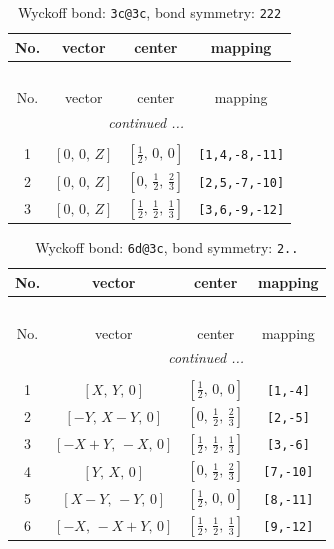 \documentclass[fleqn,8pt]{jsarticle}
\begin{document}
\renewcommand{\arraystretch}{1.2}
\begin{longtable}{cccc}
\caption{Wyckoff bond: {\tt 3c@3c}, bond symmetry: {\tt 222}}
 \\
 \hline \hline
No. & vector & center & mapping \\ \hline \endfirsthead

\multicolumn{3}{l}{\tablename\ \thetable{}} \\
 \hline \hline
No. & vector & center & mapping \\ \hline \endhead

 \hline \hline
\multicolumn{3}{r}{\footnotesize\it continued ...} \\ \endfoot

 \hline \hline
\multicolumn{3}{r}{} \\ \endlastfoot

1 & $\left[ 0,\, 0,\, Z \right]$ & $\left[ \frac{1}{2},\, 0,\, 0 \right]$ & {\tt [1,4,-8,-11]} \\ \hline
2 & $\left[ 0,\, 0,\, Z \right]$ & $\left[ 0,\, \frac{1}{2},\, \frac{2}{3} \right]$ & {\tt [2,5,-7,-10]} \\ \hline
3 & $\left[ 0,\, 0,\, Z \right]$ & $\left[ \frac{1}{2},\, \frac{1}{2},\, \frac{1}{3} \right]$ & {\tt [3,6,-9,-12]} \\
\end{longtable}
\renewcommand{\arraystretch}{1.2}
\begin{longtable}{cccc}
\caption{Wyckoff bond: {\tt 6d@3c}, bond symmetry: {\tt 2..}}
 \\
 \hline \hline
No. & vector & center & mapping \\ \hline \endfirsthead

\multicolumn{3}{l}{\tablename\ \thetable{}} \\
 \hline \hline
No. & vector & center & mapping \\ \hline \endhead

 \hline \hline
\multicolumn{3}{r}{\footnotesize\it continued ...} \\ \endfoot

 \hline \hline
\multicolumn{3}{r}{} \\ \endlastfoot

1 & $\left[ X,\, Y,\, 0 \right]$ & $\left[ \frac{1}{2},\, 0,\, 0 \right]$ & {\tt [1,-4]} \\ \hline
2 & $\left[ - Y,\, X - Y,\, 0 \right]$ & $\left[ 0,\, \frac{1}{2},\, \frac{2}{3} \right]$ & {\tt [2,-5]} \\ \hline
3 & $\left[ - X + Y,\, - X,\, 0 \right]$ & $\left[ \frac{1}{2},\, \frac{1}{2},\, \frac{1}{3} \right]$ & {\tt [3,-6]} \\ \hline
4 & $\left[ Y,\, X,\, 0 \right]$ & $\left[ 0,\, \frac{1}{2},\, \frac{2}{3} \right]$ & {\tt [7,-10]} \\ \hline
5 & $\left[ X - Y,\, - Y,\, 0 \right]$ & $\left[ \frac{1}{2},\, 0,\, 0 \right]$ & {\tt [8,-11]} \\ \hline
6 & $\left[ - X,\, - X + Y,\, 0 \right]$ & $\left[ \frac{1}{2},\, \frac{1}{2},\, \frac{1}{3} \right]$ & {\tt [9,-12]} \\
\end{longtable}
\end{document}
